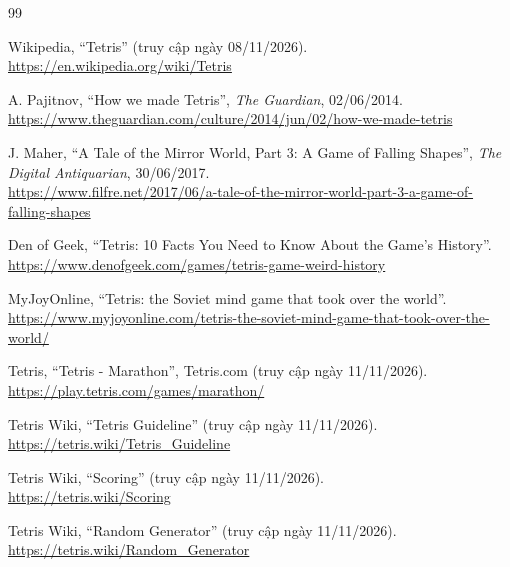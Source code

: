 \documentclass[12pt,a4paper,oneside]{report}
\begin{document}
\begin{thebibliography}{99}
\small

 Wikipedia, ``Tetris'' (truy cập ngày 08/11/2026).
\\\url{https://en.wikipedia.org/wiki/Tetris} 

 A. Pajitnov, ``How we made Tetris'', \textit{The Guardian}, 02/06/2014.\\ \url{https://www.theguardian.com/culture/2014/jun/02/how-we-made-tetris}

 J. Maher, ``A Tale of the Mirror World, Part 3: A Game of Falling Shapes'', \textit{The Digital Antiquarian}, 30/06/2017.\\
\url{https://www.filfre.net/2017/06/a-tale-of-the-mirror-world-part-3-a-game-of-falling-shapes}

 Den of Geek, ``Tetris: 10 Facts You Need to Know About the Game's History''.\\ 
\url{https://www.denofgeek.com/games/tetris-game-weird-history}

 MyJoyOnline, ``Tetris: the Soviet mind game that took over the world''.\\ 
\url{https://www.myjoyonline.com/tetris-the-soviet-mind-game-that-took-over-the-world/}

Tetris, ``Tetris - Marathon'', Tetris.com
(truy cập ngày 11/11/2026).\\
\url{https://play.tetris.com/games/marathon/}

Tetris Wiki, ``Tetris Guideline''
(truy cập ngày 11/11/2026).\\
\url{https://tetris.wiki/Tetris_Guideline}

Tetris Wiki, ``Scoring''
(truy cập ngày 11/11/2026).\\
\url{https://tetris.wiki/Scoring}

Tetris Wiki, ``Random Generator''
(truy cập ngày 11/11/2026).\\
\url{https://tetris.wiki/Random_Generator}


\end{thebibliography}
\end{document}
